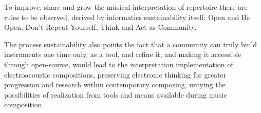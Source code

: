 \documentclass[twoside,a4paper]{article}
\begin{document}
To improve, share and grow the musical interpretation of repertoire there are rules to be observed, derived by informatics sustainability itself: Open and Be Open, Don't Repeat Yourself, Think and Act as Community.

The process sustainability also points the fact that a community can truly build instruments one time only, as a tool, and refine it, and making it accessible through open-source, would lead to the interpretation implementation of electroacoustic compositions, preserving electronic thinking for greater progression and research within contemporary composing, untying the possibilities of realization from tools and means available during music composition.

%

\nocite{*}

%
%
%
\end{document}
